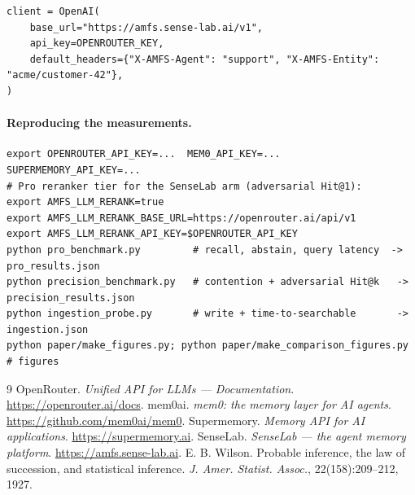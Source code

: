 \documentclass[11pt]{article}
\begin{document}
\begin{lstlisting}[style=trace]
client = OpenAI(
    base_url="https://amfs.sense-lab.ai/v1",
    api_key=OPENROUTER_KEY,
    default_headers={"X-AMFS-Agent": "support", "X-AMFS-Entity": "acme/customer-42"},
)
\end{lstlisting}

\paragraph{Reproducing the measurements.}
\begin{lstlisting}[style=trace]
export OPENROUTER_API_KEY=...  MEM0_API_KEY=...  SUPERMEMORY_API_KEY=...
# Pro reranker tier for the SenseLab arm (adversarial Hit@1):
export AMFS_LLM_RERANK=true
export AMFS_LLM_RERANK_BASE_URL=https://openrouter.ai/api/v1
export AMFS_LLM_RERANK_API_KEY=$OPENROUTER_API_KEY
python pro_benchmark.py         # recall, abstain, query latency  -> pro_results.json
python precision_benchmark.py   # contention + adversarial Hit@k   -> precision_results.json
python ingestion_probe.py       # write + time-to-searchable       -> ingestion.json
python paper/make_figures.py; python paper/make_comparison_figures.py   # figures
\end{lstlisting}

\begin{thebibliography}{9}
 OpenRouter. \emph{Unified API for LLMs --- Documentation}. \url{https://openrouter.ai/docs}.
 mem0ai. \emph{mem0: the memory layer for AI agents}. \url{https://github.com/mem0ai/mem0}.
 Supermemory. \emph{Memory API for AI applications}. \url{https://supermemory.ai}.
 SenseLab. \emph{SenseLab --- the agent memory platform}. \url{https://amfs.sense-lab.ai}.
 E. B. Wilson. Probable inference, the law of succession, and statistical inference.
  \emph{J. Amer. Statist. Assoc.}, 22(158):209--212, 1927.
\end{thebibliography}
\end{document}
